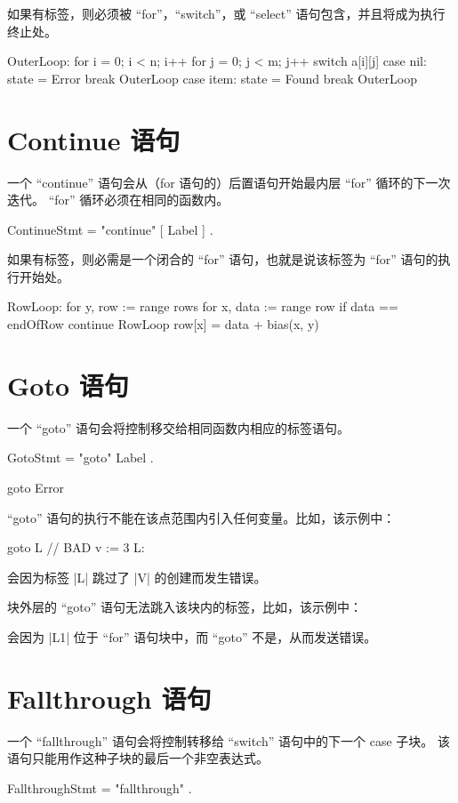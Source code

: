 如果有标签，则必须被 ``for''，``switch''，或 ``select'' 语句包含，并且将成为执行终止处。
\begin{golang}
OuterLoop:
	for i = 0; i < n; i++ {
		for j = 0; j < m; j++ {
			switch a[i][j] {
			case nil:
				state = Error
				break OuterLoop
			case item:
				state = Found
				break OuterLoop
			}
		}
	}
\end{golang}

\section{Continue 语句}\label{sec:continue}
一个 ``continue'' 语句会从（for 语句的）后置语句开始最内层 ``for'' 循环的下一次迭代。
``for'' 循环必须在相同的函数内。
\begin{EBNF}
ContinueStmt = "continue" [ Label ] .
\end{EBNF}
如果有标签，则必需是一个闭合的 ``for'' 语句，也就是说该标签为 ``for'' 语句的执行开始处。
\begin{golang}
RowLoop:
	for y, row := range rows {
		for x, data := range row {
			if data == endOfRow {
				continue RowLoop
			}
			row[x] = data + bias(x, y)
		}
	}
\end{golang}


\section{Goto 语句}\label{sec:goto}
一个 ``goto'' 语句会将控制移交给相同函数内相应的标签语句。
\begin{EBNF}
GotoStmt = "goto" Label .
\end{EBNF}

\begin{golang}
goto Error
\end{golang}

``goto'' 语句的执行不能在该点范围内引入任何变量。比如，该示例中：
\begin{golang}
	goto L  // BAD
	v := 3
L:
\end{golang}
会因为标签 \code|L| 跳过了 \code|V| 的创建而发生错误。

块外层的 ``goto'' 语句无法跳入该块内的标签，比如，该示例中：
会因为 \code|L1| 位于 ``for'' 语句块中，而 ``goto'' 不是，从而发送错误。

\section{Fallthrough 语句}
一个 ``fallthrough'' 语句会将控制转移给 ``switch'' 语句中的下一个 case 子块。
该语句只能用作这种子块的最后一个非空表达式。
\begin{EBNF}
FallthroughStmt = "fallthrough" .
\end{EBNF}

